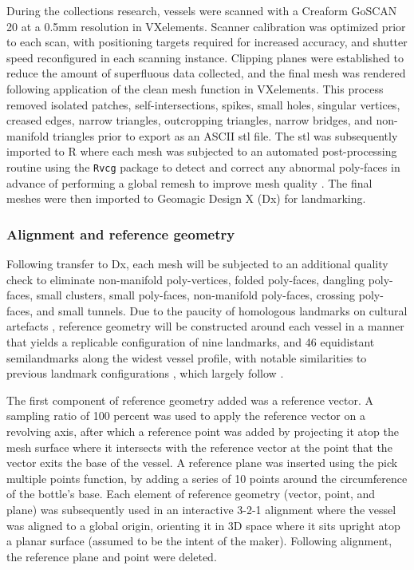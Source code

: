 \documentclass[]{interact}
\theoremstyle{plain}%
\theoremstyle{definition}
\theoremstyle{remark}
\begin{document}
During the collections research, vessels were scanned with a Creaform
GoSCAN 20 at a 0.5mm resolution in VXelements. Scanner calibration was
optimized prior to each scan, with positioning targets required for
increased accuracy, and shutter speed reconfigured in each scanning
instance. Clipping planes were established to reduce the amount of
superfluous data collected, and the final mesh was rendered following
application of the clean mesh function in VXelements. This process
removed isolated patches, self-intersections, spikes, small holes,
singular vertices, creased edges, narrow triangles, outcropping
triangles, narrow bridges, and non-manifold triangles prior to export as
an ASCII stl file. The stl was subsequently imported to R where each
mesh was subjected to an automated post-processing routine using the
\texttt{Rvcg} package to detect and correct any abnormal poly-faces in
advance of performing a global remesh to improve mesh quality
\citep{RN8497}. The final meshes were then imported to Geomagic Design X
(Dx) for landmarking.

\hypertarget{alignment-and-reference-geometry}{%
\subsubsection{Alignment and reference
geometry}\label{alignment-and-reference-geometry}}

Following transfer to Dx, each mesh will be subjected to an additional
quality check to eliminate non-manifold poly-vertices, folded
poly-faces, dangling poly-faces, small clusters, small poly-faces,
non-manifold poly-faces, crossing poly-faces, and small tunnels. Due to
the paucity of homologous landmarks on cultural artefacts
\citep{RN8521}, reference geometry will be constructed around each
vessel in a manner that yields a replicable configuration of nine
landmarks, and 46 equidistant semilandmarks along the widest vessel
profile, with notable similarities to previous landmark configurations
\citep{RN7039,RN7925,RN8071,RN8361,RN8967,RN8375}, which largely follow
\citet{RN5700}.

The first component of reference geometry added was a reference vector.
A sampling ratio of 100 percent was used to apply the reference vector
on a revolving axis, after which a reference point was added by
projecting it atop the mesh surface where it intersects with the
reference vector at the point that the vector exits the base of the
vessel. A reference plane was inserted using the pick multiple points
function, by adding a series of 10 points around the circumference of
the bottle's base. Each element of reference geometry (vector, point,
and plane) was subsequently used in an interactive 3-2-1 alignment where
the vessel was aligned to a global origin, orienting it in 3D space
where it sits upright atop a planar surface (assumed to be the intent of
the maker). Following alignment, the reference plane and point were
deleted.
\end{document}
